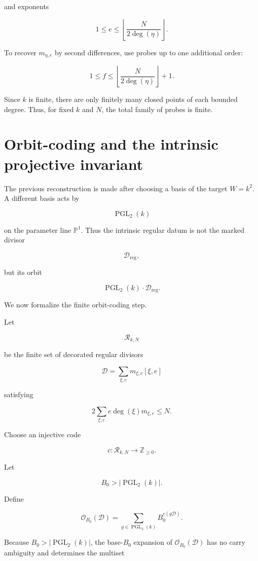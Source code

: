 \documentclass[11pt]{article}
\begin{document}
and exponents

\[
1\le e\le \left\lfloor\frac{N}{2\deg(\eta)}\right\rfloor.
\]

To recover $m_{\eta,e}$ by second differences, use probes up to one additional order:

\[
1\le f\le
\left\lfloor\frac{N}{2\deg(\eta)}\right\rfloor+1.
\]

Since $k$ is finite, there are only finitely many closed points of each bounded degree. Thus, for fixed $k$ and $N$, the total family of probes is finite.

\section{Orbit-coding and the intrinsic projective invariant}

The previous reconstruction is made after choosing a basis of the target $W=k^2$. A different basis acts by

\[
\operatorname{PGL}_2(k)
\]

on the parameter line $\mathbb P^1$. Thus the intrinsic regular datum is not the marked divisor

\[
\mathcal D_{\mathrm{reg}},
\]

but its orbit

\[
\operatorname{PGL}_2(k)\cdot\mathcal D_{\mathrm{reg}}.
\]

We now formalize the finite orbit-coding step.

Let

\[
\mathcal R_{k,N}
\]

be the finite set of decorated regular divisors

\[
\mathcal D=\sum_{\xi,e}m_{\xi,e}[\xi,e]
\]

satisfying

\[
2\sum_{\xi,e}e\deg(\xi)m_{\xi,e}\le N.
\]

Choose an injective code

\[
c:\mathcal R_{k,N}\to\mathbb Z_{\ge0}.
\]

Let

\[
B_0>|\operatorname{PGL}_2(k)|.
\]

Define

\[
\mathcal O_{B_0}(\mathcal D)
=
\sum_{g\in \operatorname{PGL}_2(k)}
B_0^{c(g\mathcal D)}.
\]

Because $B_0>|\operatorname{PGL}_2(k)|$, the base-$B_0$ expansion of $\mathcal O_{B_0}(\mathcal D)$ has no carry ambiguity and determines the multiset
\end{document}
